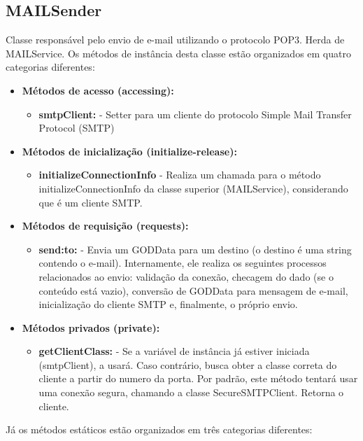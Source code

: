 \subsection{MAILSender}

Classe responsável pelo envio de e-mail utilizando o protocolo POP3. Herda de MAILService. Os métodos de instância desta classe estão organizados em quatro categorias diferentes:

\begin{itemize}
	\item \textbf{Métodos de acesso (accessing):}
	\begin{itemize}
		\item \textbf{smtpClient:} - Setter para um cliente do protocolo Simple Mail Transfer Protocol (SMTP)
	\end{itemize}
	\item \textbf{Métodos de inicialização (initialize-release):}
	\begin{itemize}
		\item \textbf{initializeConnectionInfo} - Realiza um chamada para o método initializeConnectionInfo da classe superior (MAILService), considerando que é um cliente SMTP.
	\end{itemize}
	\item \textbf{Métodos de requisição (requests):}
	\begin{itemize}
		\item \textbf{send:to:} - Envia um GODData para um destino (o destino é uma string contendo o e-mail). Internamente, ele realiza os seguintes processos relacionados ao envio: validação da conexão, checagem do dado (se o conteúdo está vazio), conversão de GODData para mensagem de e-mail, inicialização do cliente SMTP e, finalmente, o próprio envio.
	\end{itemize}
	\item \textbf{Métodos privados (private):}
	\begin{itemize}
		\item \textbf{getClientClass:} - Se a variável de instância já estiver iniciada (smtpClient), a usará. Caso contrário, busca obter a classe correta do cliente a partir do numero da porta. Por padrão, este método tentará usar uma conexão segura, chamando a classe SecureSMTPClient. Retorna o cliente.
	\end{itemize}
\end{itemize}

Já os métodos estáticos estão organizados em três categorias diferentes:


